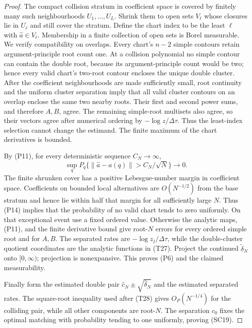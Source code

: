 \begin{proof}
The compact collision stratum in coefficient space is covered by finitely
many such neighbourhoods \(U_1,\ldots,U_L\).  Shrink them to open sets
\(V_\ell\) whose closures lie in \(U_\ell\) and still cover the stratum.
Define the chart index to be the least \(\ell\) with
\(\widehat a\in V_\ell\).  Membership in a finite collection of open sets is
Borel measurable.  We verify compatibility on overlaps.  Every chart's
\(n-2\) simple contours retain argument-principle root count one.  At a
collision polynomial no simple contour can contain the double root, because
its argument-principle count would be two; hence every valid chart's
two-root contour encloses the unique double cluster.  After the coefficient
neighbourhoods are made sufficiently small, root continuity and the uniform
cluster separation imply that all valid cluster contours on an overlap
enclose the same two nearby roots.  Their first and second power sums, and
therefore \(A,B\), agree.  The remaining simple-root multisets also agree,
so their vectors agree after numerical ordering by
\(-\log z/\Delta\tau\).  Thus the least-index selection cannot change the
estimand.  The finite maximum of the chart derivatives is bounded.

By \textup{(P11)}, for every deterministic sequence \(C_N\to\infty\),
\[
 \sup_qP_q\{\|\widehat a-a(q)\|>C_N/\sqrt N\}\longrightarrow0.
\tag{P14}
\]
The finite shrunken cover has a positive Lebesgue-number margin in coefficient
space.  Coefficients on bounded local alternatives are \(O(N^{-1/2})\) from
the base stratum and hence lie within half that margin for all sufficiently
large \(N\).  Thus \textup{(P14)} implies that the probability of no valid
chart tends to zero uniformly.  On that exceptional event use a fixed ordered
value.
Otherwise the analytic maps, \textup{(P11)}, and the finite derivative bound
give root-\(N\) errors for every ordered simple root and for \(A,B\).  The
separated rates are \(-\log z_j/\Delta\tau\), while the double-cluster
quotient coordinates are the analytic functions in \textup{(T27)}.  Project
the continued \(\widetilde\delta_N\) onto \([0,\infty)\); projection is
nonexpansive.  This proves \textup{(P6)} and the claimed measurability.

Finally form the estimated double pair
\(\widehat c_N\pm\sqrt{\widehat\delta_N}\) and the estimated separated
rates.  The square-root inequality used after \textup{(T28)} gives
\(O_P(N^{-1/4})\) for the colliding pair, while all other components are
root-\(N\).  The separation \(c_0\) fixes the optimal matching with
probability tending to one uniformly, proving \textup{(SC19)}.
\end{proof}

